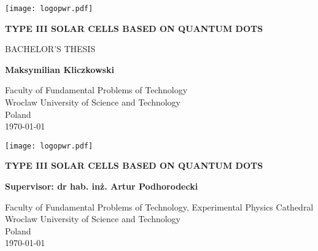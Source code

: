 \begin{titlepage}
   \begin{center}
       \vspace*{1cm}
       
	   \texttt{[image: logopwr.pdf]}
	   
	   \vspace*{5cm}
	   
       \textbf{\Huge TYPE III SOLAR CELLS \vspace{0.1cm} BASED ON QUANTUM DOTS}
       
       \vspace{1.5cm}
       
 	   \Large BACHELOR'S THESIS
 	   
       \vfill
       
	   \textbf{Maksymilian Kliczkowski}
       \vspace{0.8cm}
 
       
 
       \small Faculty of Fundamental Problems of Technology\\
       Wroclaw University of Science and Technology\\
       Poland\\
       \today
 
   \end{center}
\end{titlepage}

\newpage
\thispagestyle{plain}
 \begin{center}
       \vspace*{1cm}
       
	   \texttt{[image: logopwr.pdf]}
	   
	   \vspace*{5cm}
	   
       \textbf{\Huge TYPE III SOLAR CELLS \vspace{0.1cm} BASED ON QUANTUM DOTS}
       
       \vspace{1.5cm}
 	   
       
	   \Large \textbf{Supervisor: dr hab. inż. Artur Podhorodecki}
       \vspace{1.8cm}
 
       
 
       \small Faculty of Fundamental Problems of Technology, Experimental Physics Cathedral\\
       Wroclaw University of Science and Technology\\
       Poland\\
       \today
 
   \end{center}